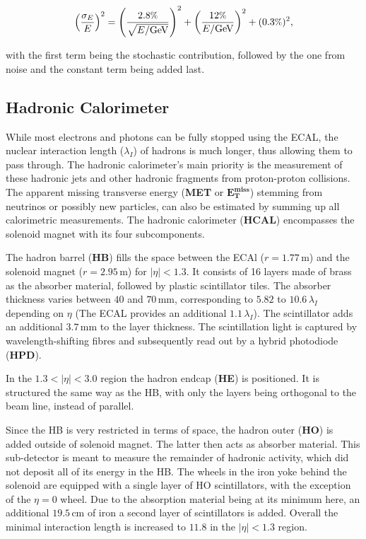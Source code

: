 \begin{equation}
  \label{eq:ecalreso}
  \left( \frac{ \sigma_E}{E} \right)^2 = \left( \frac{2.8\pct}{\sqrt{E/\text{GeV}}} \right)^2 + \left( \frac{12\pct}{E/\text{GeV}} \right)^2 + (0.3\pct)^2,
\end{equation}

\noindent with the first term being the stochastic contribution, followed by the one from noise and the constant term being added last.


\subsection{Hadronic Calorimeter}

While most electrons and photons can be fully stopped using the ECAL, the nuclear interaction length ($\lambda_I$) of hadrons is much longer, thus allowing them to pass through. The hadronic calorimeter's main priority is the measurement of these hadronic jets and other hadronic fragments from proton-proton collisions. The apparent missing transverse energy (\textbf{MET} or $\mathbf{E^{\text{miss}}_{\text{T}}}$) stemming from neutrinos or possibly new particles, can also be estimated by summing up all calorimetric measurements. The hadronic calorimeter (\textbf{HCAL}) encompasses the solenoid magnet with its four subcomponents. 

The hadron barrel (\textbf{HB}) fills the space between the ECAl ($r = 1.77\,\text{m}$) and the solenoid magnet ($r = 2.95\,\text{m}$) for $|\eta| < 1.3$. It consists of 16 layers made of brass as the absorber material, followed by plastic scintillator tiles. The absorber thickness varies between $40$ and $70\,\text{mm}$, corresponding to $5.82$ to $10.6\,\lambda_I$ depending on $\eta$ (The ECAL provides an additional $1.1\,\lambda_I$). The scintillator adds an additional $3.7\,\text{mm}$ to the layer thickness. The scintillation light is captured by wavelength-shifting fibres and subsequently read out by a hybrid photodiode (\textbf{HPD}).

In the $1.3 < |\eta| < 3.0$ region the hadron endcap (\textbf{HE}) is positioned. It is structured the same way as the HB, with only the layers being orthogonal to the beam line, instead of parallel.

Since the HB is very restricted in terms of space, the hadron outer (\textbf{HO}) is added outside of solenoid magnet. The latter then acts as absorber material. This sub-detector is meant to measure the remainder of hadronic activity, which did not deposit all of its energy in the HB. The wheels in the iron yoke behind the solenoid are equipped with a single layer of HO scintillators, with the exception of the $\eta = 0$ wheel. Due to the absorption material being at its minimum here, an additional $19.5\,\text{cm}$ of iron a second layer of scintillators is added. Overall the minimal interaction length is increased to $11.8$ in the $|\eta| < 1.3$ region.

